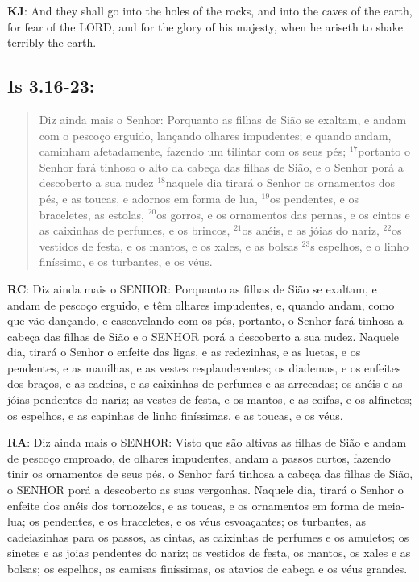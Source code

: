 \textbf{KJ}: And they shall go into the holes of the rocks, and into the caves of the earth, for fear of the LORD, and for the glory of his majesty, when he ariseth to shake terribly the earth.

\subsection*{Is 3.16-23:} 
 \begin{quote} 
 Diz ainda mais o Senhor: Porquanto as filhas de Sião se exaltam, e andam com o pescoço erguido, lançando olhares impudentes; e quando andam, caminham afetadamente, fazendo um tilintar com os seus pés; $^{\mathrm{17}}$portanto o Senhor fará tinhoso o alto da cabeça das filhas de Sião, e o Senhor porá a descoberto a sua nudez\uwave{,} $^{\mathrm{18}}$naquele dia tirará o Senhor os ornamentos dos pés, e as toucas, e adornos em forma de lua, $^{\mathrm{19}}$os pendentes, e os braceletes, as estolas, $^{\mathrm{20}}$os gorros, e os ornamentos das pernas, e os cintos e as caixinhas de perfumes, e os brincos, $^{\mathrm{21}}$os anéis, e as jóias do nariz, $^{\mathrm{22}}$os vestidos de festa, e os mantos, e os xales, e as bolsas $^{\mathrm{23}}$s espelhos, e o linho finíssimo, e os turbantes, e os véus.
\end{quote}

\textbf{RC}: Diz ainda mais o SENHOR: Porquanto as filhas de Sião se exaltam, e andam de pescoço erguido, e têm olhares impudentes, e, quando andam, como que vão dançando, e cascavelando com os pés, portanto, o Senhor fará tinhosa a cabeça das filhas de Sião e o SENHOR porá a descoberto a sua nudez. Naquele dia, tirará o Senhor o enfeite das ligas, e as redezinhas, e as luetas, e os pendentes, e as manilhas, e as vestes resplandecentes; os diademas, e os enfeites dos braços, e as cadeias, e as caixinhas de perfumes e as arrecadas; os anéis e as jóias pendentes do nariz; as vestes de festa, e os mantos, e as coifas, e os alfinetes; os espelhos, e as capinhas de linho finíssimas, e as toucas, e os véus.

\textbf{RA}: Diz ainda mais o SENHOR: Visto que são altivas as filhas de Sião e andam de pescoço emproado, de olhares impudentes, andam a passos curtos, fazendo tinir os ornamentos de seus pés, o Senhor fará tinhosa a cabeça das filhas de Sião, o SENHOR porá a descoberto as suas vergonhas. Naquele dia, tirará o Senhor o enfeite dos anéis dos tornozelos, e as toucas, e os ornamentos em forma de meia-lua; os pendentes, e os braceletes, e os véus esvoaçantes; os turbantes, as cadeiazinhas para os passos, as cintas, as caixinhas de perfumes e os amuletos; os sinetes e as joias pendentes do nariz; os vestidos de festa, os mantos, os xales e as bolsas; os espelhos, as camisas finíssimas, os atavios de cabeça e os véus grandes.

